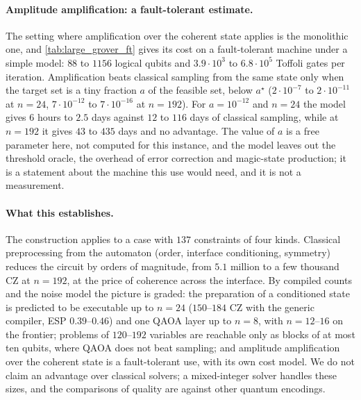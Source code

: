 \paragraph{Amplitude amplification: a fault-tolerant estimate.} The setting where amplification over the coherent state applies is the monolithic one, and \cref{tab:large_grover_ft} gives its cost on a fault-tolerant machine under a simple model: $88$ to $1156$ logical qubits and $3.9\cdot10^3$ to $6.8\cdot10^5$ Toffoli gates per iteration. Amplification beats classical sampling from the same state only when the target set is a tiny fraction $a$ of the feasible set, below $a^\star$ ($2\cdot10^{-7}$ to $2\cdot10^{-11}$ at $n=24$, $7\cdot10^{-12}$ to $7\cdot10^{-16}$ at $n=192$). For $a=10^{-12}$ and $n=24$ the model gives $6$ hours to $2.5$ days against $12$ to $116$ days of classical sampling, while at $n=192$ it gives $43$ to $435$ days and no advantage. The value of $a$ is a free parameter here, not computed for this instance, and the model leaves out the threshold oracle, the overhead of error correction and magic-state production; it is a statement about the machine this use would need, and it is not a measurement.



\paragraph{What this establishes.} The construction applies to a case with $137$ constraints of four kinds. Classical preprocessing from the automaton (order, interface conditioning, symmetry) reduces the circuit by orders of magnitude, from $5.1$ million to a few thousand CZ at $n=192$, at the price of coherence across the interface. By compiled counts and the noise model the picture is graded: the preparation of a conditioned state is predicted to be executable up to $n=24$ ($150$--$184$ CZ with the generic compiler, ESP $0.39$--$0.46$) and one QAOA layer up to $n=8$, with $n=12$--$16$ on the frontier; problems of $120$--$192$ variables are reachable only as blocks of at most ten qubits, where QAOA does not beat sampling; and amplitude amplification over the coherent state is a fault-tolerant use, with its own cost model. We do not claim an advantage over classical solvers; a mixed-integer solver handles these sizes, and the comparisons of quality are against other quantum encodings.
